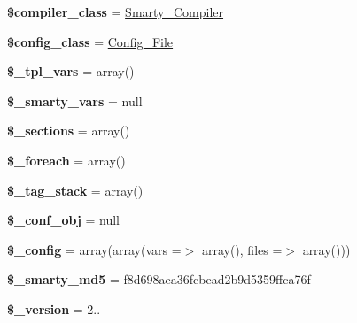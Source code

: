 \begin{DoxyCompactItemize}
{\bfseries \$compiler\+\_\+class} = \textquotesingle{}\mbox{\hyperlink{class_smarty___compiler}{Smarty\+\_\+\+Compiler}}\textquotesingle{}
\item 
\mbox{\label{class_smarty_a52fcef6ddacea8a8a0c981814fc1711d}} 
{\bfseries \$config\+\_\+class} = \textquotesingle{}\mbox{\hyperlink{class_config___file}{Config\+\_\+\+File}}\textquotesingle{}
\item 
\mbox{\label{class_smarty_ae1b1aece9eb35b004063a4b3dc0feaf1}} 
{\bfseries \$\+\_\+tpl\+\_\+vars} = array()
\item 
\mbox{\label{class_smarty_af50e967edf019c7e1ff8aac6d3b7e863}} 
{\bfseries \$\+\_\+smarty\+\_\+vars} = null
\item 
\mbox{\label{class_smarty_aaa270809b7ea9e030553fdc3377a4e1a}} 
{\bfseries \$\+\_\+sections} = array()
\item 
\mbox{\label{class_smarty_a1dd3979a1a79b80bee65c264359296b7}} 
{\bfseries \$\+\_\+foreach} = array()
\item 
\mbox{\label{class_smarty_a76eb391e0b94323b8f7327c37ace091f}} 
{\bfseries \$\+\_\+tag\+\_\+stack} = array()
\item 
\mbox{\label{class_smarty_a5f0dd987c8e23a71a4b82f7546ebfd58}} 
{\bfseries \$\+\_\+conf\+\_\+obj} = null
\item 
\mbox{\label{class_smarty_afaa2eada2fb8fd57a9c7dd1a265ef6f5}} 
{\bfseries \$\+\_\+config} = array(array(\textquotesingle{}vars\textquotesingle{} =$>$ array(), \textquotesingle{}files\textquotesingle{} =$>$ array()))
\item 
\mbox{\label{class_smarty_a9f507bbfb7b4e9b0ca21de4b2a7b7a2f}} 
{\bfseries \$\+\_\+smarty\+\_\+md5} = \textquotesingle{}f8d698aea36fcbead2b9d5359ffca76f\textquotesingle{}
\item 
\mbox{\label{class_smarty_a16c920b65d69f217df16cb23e39fe1a8}} 
{\bfseries \$\+\_\+version} = \textquotesingle{}2..\textquotesingle{}
\item 

\end{DoxyCompactItemize}
